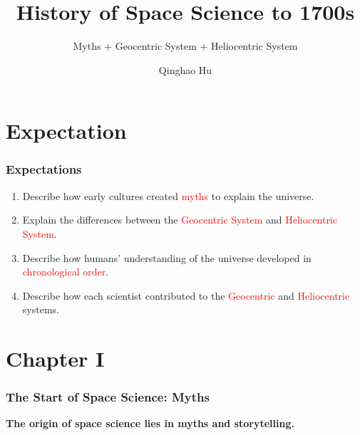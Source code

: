 \documentclass[aspectratio=1611, 9pt]{beamer}
\title[SES4U]{History of Space Science to 1700s}
\subtitle{Myths + Geocentric System + Heliocentric System}
\author{Qinghao Hu}
\begin{document}
\frame{\titlepage}

\section{Expectation}
\begin{frame}
  \frametitle{Expectations}
  \begin{enumerate}
    \item Describe how early cultures created \textcolor{red}{myths} to explain the universe.
    \item Explain the differences between the \textcolor{red}{Geocentric System} and \textcolor{red}{Heliocentric System}.
    \item Describe how humans' understanding of the universe developed in \textcolor{red}{chronological order}.
    \item Describe how each scientist contributed to the \textcolor{red}{Geocentric} and \textcolor{red}{Heliocentric} systems.
  \end{enumerate}
\end{frame}

\section{Chapter I}
\begin{frame}
  \frametitle{The Start of Space Science: Myths}
  \begin{center}
    \textbf{The origin of space science lies in myths and storytelling.}
  \end{center}
\end{frame}
\end{document}
